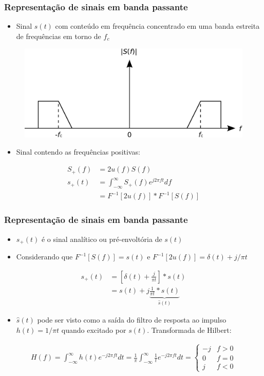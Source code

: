 \begin{frame}
	\frametitle{Representação de sinais em banda passante}

	\begin{itemize}
	 \item Sinal $s(t)$ com conteúdo em frequência concentrado em uma banda estreita de frequências em torno de $f_c$
	\end{itemize}
	\begin{figure}[t]
	  \begin{center}
	    \includegraphics[width=0.5\columnwidth]{figs/4-1-1}
	  \end{center}
	\end{figure}
	\begin{itemize}
	 \item Sinal contendo as frequências positivas:
	\end{itemize}
	\begin{align*}
	      S_+(f) &= 2u(f)S(f) \\
	      s_+(t) &= \int_{-\infty}^{\infty}S_+(f)e^{j2\pi ft}df \\
	      &= F^{-1}[2u(f)] \ast F^{-1}[S(f)]
	\end{align*}

\end{frame}

\begin{frame}
	\frametitle{Representação de sinais em banda passante}

	\begin{itemize}
	 \item $s_+(t)$ é o sinal analítico ou pré-envoltória de $s(t)$
	 \item Considerando que $F^{-1}[S(f)] = s(t)$ e $F^{-1}[2u(f)] = \delta(t) + j/\pi t$
	\end{itemize}
	\begin{align*}
	    s_+(t) &= \left[ \delta(t) + \frac{j}{\pi t} \right] \ast s(t) \\
		  &= s(t) + j \underbrace{\frac{1}{\pi t}\ast s(t)}_{\hat{s}(t)}
	\end{align*}
	\begin{itemize}
	 \item $\hat{s}(t)$ pode ser visto como a saída do filtro de resposta ao impulso $h(t) = 1/\pi t$ quando excitado por $s(t)$. Transformada de Hilbert:
	\end{itemize}
	\begin{align*}
	    H(f) = \int_{-\infty}^{\infty} h(t) e^{-j2\pi ft}dt = \frac{1}{\pi} \int_{-\infty}^{\infty} \frac{1}{t} e^{-j2\pi ft}dt = \begin{cases} -j & f>0 \\ 0 & f = 0 \\ j & f < 0 \end{cases}
	\end{align*}
\end{frame}

